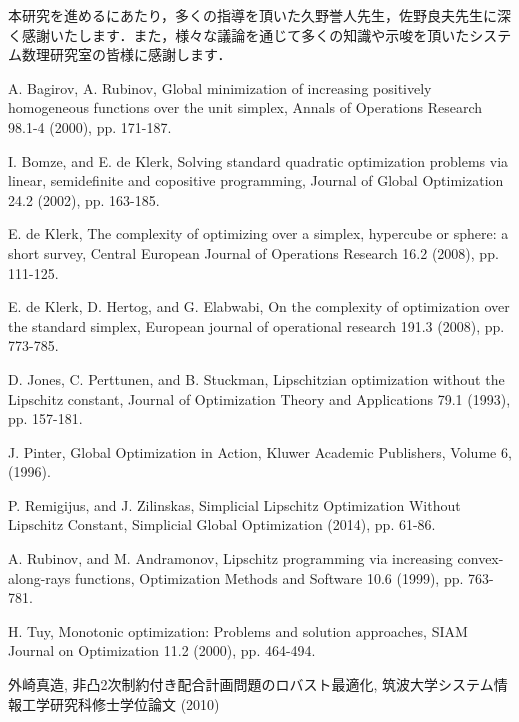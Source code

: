 \documentclass[a4paper,11pt]{jreport}
\begin{document}
本研究を進めるにあたり，多くの指導を頂いた久野誉人先生，佐野良夫先生に深く感謝いたします．また，様々な議論を通じて多くの知識や示唆を頂いたシステム数理研究室の皆様に感謝します．

\newpage

\renewcommand{\bibname}{参考文献}

\begin{thebibliography}{1}

A. Bagirov, A. Rubinov,
\newblock Global minimization of increasing positively homogeneous functions over the unit simplex,
\newblock Annals of Operations Research 98.1-4 (2000), pp. 171-187.

I. Bomze, and E. de Klerk,
\newblock Solving standard quadratic optimization problems via linear, semidefinite and copositive programming,
\newblock Journal of Global Optimization 24.2 (2002), pp. 163-185.

E. de Klerk,
\newblock The complexity of optimizing over a simplex, hypercube or sphere: a short survey,
\newblock Central European Journal of Operations Research 16.2 (2008), pp. 111-125.

E. de Klerk, D. Hertog, and G. Elabwabi,
\newblock On the complexity of optimization over the standard simplex,
\newblock European journal of operational research 191.3 (2008), pp. 773-785.

D. Jones, C. Perttunen, and B. Stuckman,
\newblock Lipschitzian optimization without the Lipschitz constant,
\newblock Journal of Optimization Theory and Applications 79.1 (1993), pp. 157-181.

J. Pinter,
\newblock Global Optimization in Action,
\newblock Kluwer Academic Publishers, Volume 6, (1996).

P. Remigijus, and J. Zilinskas,
\newblock Simplicial Lipschitz Optimization Without Lipschitz Constant,
\newblock Simplicial Global Optimization (2014), pp. 61-86.

A. Rubinov, and M. Andramonov,
\newblock Lipschitz programming via increasing convex-along-rays functions,
\newblock Optimization Methods and Software 10.6 (1999), pp. 763-781.

H. Tuy,
\newblock Monotonic optimization: Problems and solution approaches,
\newblock SIAM Journal on Optimization 11.2 (2000), pp. 464-494.

外崎真造,
\newblock 非凸2次制約付き配合計画問題のロバスト最適化,
\newblock 筑波大学システム情報工学研究科修士学位論文 (2010)

\end{thebibliography}
\end{document}
